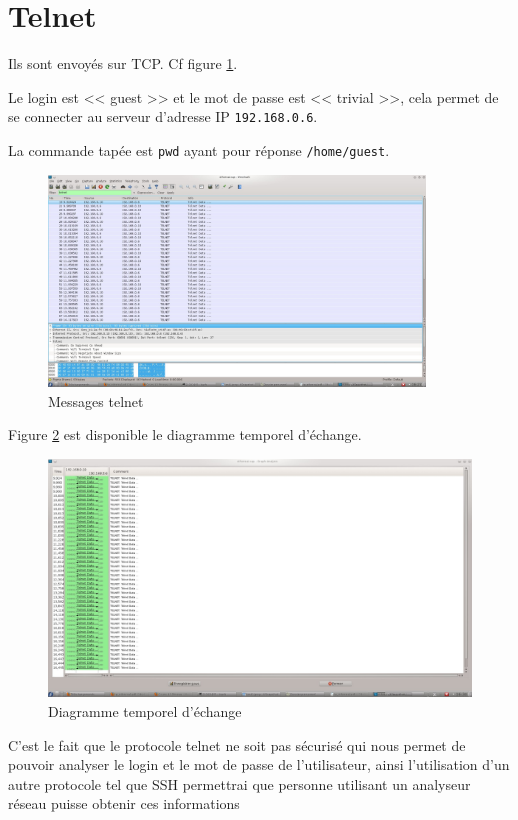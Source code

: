 \documentclass[12pt,a4paper,openany]{article}
\begin{document}
	\section{Telnet}
	Ils sont envoyés sur TCP. Cf figure \ref{fig:telnettcp}.
	
	Le login est << guest >> et le mot de passe est << trivial >>, cela permet de se connecter au serveur d'adresse IP \texttt{192.168.0.6}.

	La commande tapée est \texttt{pwd} ayant pour réponse \texttt{/home/guest}. 

	\begin{figure}[H]
		\centering
		\includegraphics[width=10cm]{capture3.jpeg}
		\caption{Messages telnet}
		\label{fig:telnettcp}
	\end{figure}
	
	Figure \ref{fig:telnetdiag} est disponible le diagramme temporel d'échange.
	\begin{figure}[H]
		\centering
		\includegraphics[width=13cm]{capture4.jpeg}
		\caption{Diagramme temporel d'échange}
		\label{fig:telnetdiag}
	\end{figure}

	\begin{remarque}
		C'est le fait que le protocole telnet ne soit pas sécurisé qui nous permet de pouvoir analyser le login et le mot de passe de l'utilisateur,
		ainsi l'utilisation d'un autre protocole tel que SSH permettrai que personne utilisant un analyseur réseau puisse obtenir ces informations
	\end{remarque}
\end{document}
